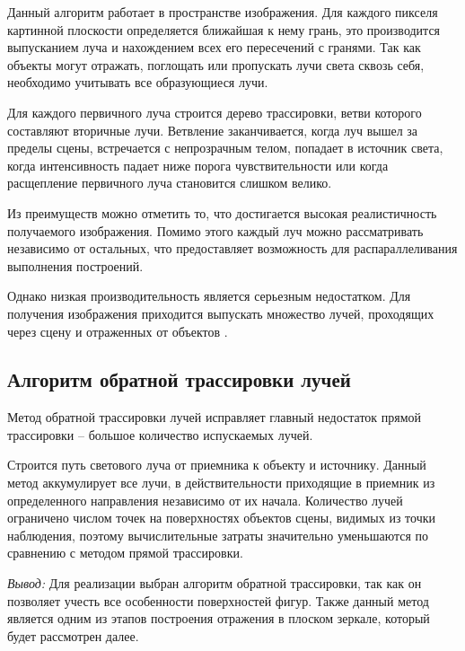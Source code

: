 Данный алгоритм работает в пространстве изображения. Для каждого пикселя картинной плоскости определяется ближайшая к нему грань, это производится выпусканием луча и нахождением всех его пересечений с гранями. Так как объекты могут отражать, поглощать или пропускать лучи света сквозь себя, необходимо учитывать все образующиеся лучи. 

Для каждого первичного луча строится дерево трассировки, ветви которого составляют вторичные лучи. Ветвление заканчивается, когда луч вышел за пределы сцены, встречается с непрозрачным телом, попадает в источник света, когда интенсивность падает ниже порога чувствительности или когда расщепление первичного луча становится слишком велико.

Из преимуществ можно отметить то, что достигается высокая реалистичность получаемого изображения. Помимо этого каждый луч можно рассматривать независимо от остальных, что предоставляет возможность для распараллеливания выполнения построений.

Однако низкая производительность является серьезным недостатком. Для получения изображения приходится выпускать множество лучей, проходящих через сцену и отраженных от объектов \cite{alg_comp_graph}.

\subsection{Алгоритм обратной трассировки лучей}

Метод обратной трассировки лучей исправляет главный недостаток прямой трассировки -- большое количество испускаемых лучей. 

Строится путь светового луча от приемника к объекту и источнику. Данный метод аккумулирует все лучи, в действительности приходящие в приемник из определенного направления независимо от их начала. Количество лучей ограничено числом точек на поверхностях объектов сцены, видимых из точки наблюдения, поэтому вычислительные затраты значительно уменьшаются по сравнению с методом прямой трассировки.\newline

\textit{Вывод:} Для реализации выбран алгоритм обратной трассировки, так как он позволяет учесть все особенности поверхностей фигур. Также данный метод является одним из этапов построения отражения в плоском зеркале, который будет рассмотрен далее.


